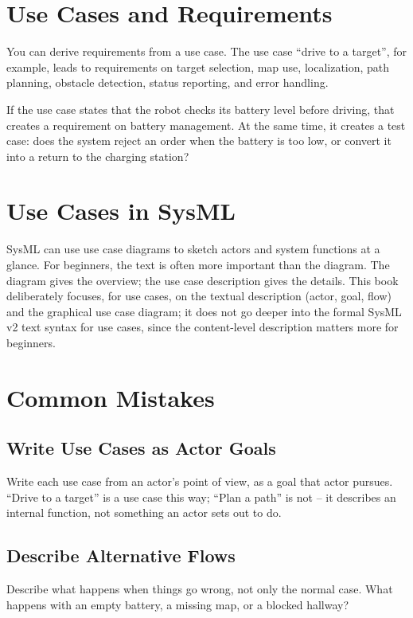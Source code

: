 \section{Use Cases and Requirements}
You can derive requirements from a use case. The use case \enquote{drive to a target}, for example, leads to requirements on target selection, map use, localization, path planning, obstacle detection, status reporting, and error handling.

\begin{praxisbox}
If the use case states that the robot checks its battery level before driving, that creates a requirement on battery management. At the same time, it creates a test case: does the system reject an order when the battery is too low, or convert it into a return to the charging station?
\end{praxisbox}

\section{Use Cases in SysML}
SysML can use use case diagrams to sketch actors and system functions at a glance. For beginners, the text is often more important than the diagram. The diagram gives the overview; the use case description gives the details. This book deliberately focuses, for use cases, on the textual description (actor, goal, flow) and the graphical use case diagram; it does not go deeper into the formal SysML v2 text syntax for use cases, since the content-level description matters more for beginners.

\section{Common Mistakes}
\subsection{Write Use Cases as Actor Goals}
Write each use case from an actor's point of view, as a goal that actor pursues. \enquote{Drive to a target} is a use case this way; \enquote{Plan a path} is not -- it describes an internal function, not something an actor sets out to do.

\subsection{Describe Alternative Flows}
Describe what happens when things go wrong, not only the normal case. What happens with an empty battery, a missing map, or a blocked hallway?

